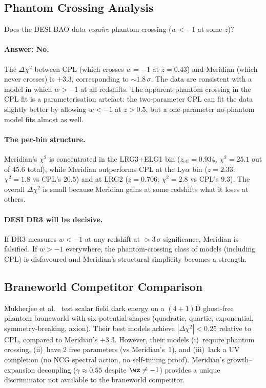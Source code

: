 \subsection{Phantom Crossing Analysis}
\label{sec:2-DESI-phantom}

Does the DESI BAO data \emph{require} phantom crossing ($w < -1$ at some $z$)?

\paragraph{Answer: No.} The $\Delta\chi^2$ between CPL (which crosses $w = -1$ at $z = 0.43$) and Meridian (which never crosses) is $+3.3$, corresponding to $\sim\!1.8\,\sigma$. The data are consistent with a model in which $w > -1$ at all redshifts. The apparent phantom crossing in the CPL fit is a parameterisation artefact: the two-parameter CPL can fit the data slightly better by allowing $w < -1$ at $z > 0.5$, but a one-parameter no-phantom model fits almost as well.

\paragraph{The per-bin structure.} Meridian's $\chi^2$ is concentrated in the LRG3+ELG1 bin ($z_\mathrm{eff} = 0.934$, $\chi^2 = 25.1$ out of 45.6 total), while Meridian outperforms CPL at the Ly$\alpha$ bin ($z = 2.33$: $\chi^2 = 1.8$ vs CPL's $20.5$) and at LRG2 ($z = 0.706$: $\chi^2 = 2.8$ vs CPL's $9.3$). The overall $\Delta\chi^2$ is small because Meridian gains at some redshifts what it loses at others.

\paragraph{DESI DR3 will be decisive.} If DR3 measures $w < -1$ at any redshift at $> 3\,\sigma$ significance, Meridian is falsified. If $w > -1$ everywhere, the phantom-crossing class of models (including CPL) is disfavoured and Meridian's structural simplicity becomes a strength.

\subsection{Braneworld Competitor Comparison}
\label{sec:2-DESI-braneworld}

Mukherjee et al.~\cite{ch2:mukherjee25} test scalar field dark energy on a $(4{+}1)$D ghost-free phantom braneworld with six potential shapes (quadratic, quartic, exponential, symmetry-breaking, axion). Their best models achieve $|\Delta\chi^2| < 0.25$ relative to CPL, compared to Meridian's $+3.3$. However, their models (i)~require phantom crossing, (ii)~have 2 free parameters (vs Meridian's~1), and (iii)~lack a UV completion (no NCG spectral action, no self-tuning proof). Meridian's growth--expansion decoupling ($\gamma \approx 0.55$ despite $\wz \neq -1$) provides a unique discriminator not available to the braneworld competitor.


